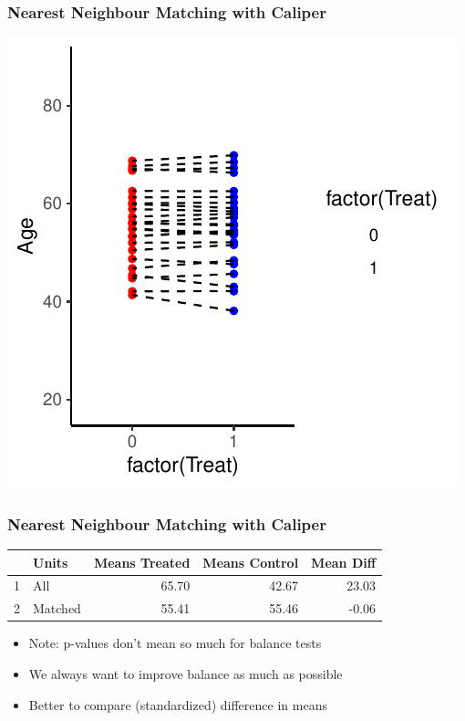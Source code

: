 \documentclass[xcolor=x11names,compress]{beamer}\usepackage[]{graphicx}\usepackage[]{color}
\makeatletter
\def\maxwidth{ %
  \ifdim\Gin@nat@width>\linewidth
    \linewidth
  \else
    \Gin@nat@width
  \fi
}
\newenvironment{knitrout}{}{} %
\renewcommand{\(}{\begin{columns}}
\renewcommand{\)}{\end{columns}}
\newcommand{\<}[1]{\begin{column}{#1}}
\renewcommand{\>}{\end{column}}
\makeatother
\begin{document}
\begin{frame}
\frametitle{Nearest Neighbour Matching with Caliper}
\begin{center}
\begin{knitrout}
\color{fgcolor}
\includegraphics[width=\maxwidth]{figure/nearest_matching_4_caliper-1} 

\end{knitrout}
\end{center}
\end{frame}

\begin{frame}
\frametitle{Nearest Neighbour Matching with Caliper}
\begin{center}
\begin{table}[ht]
\centering
\begin{tabular}{rlrrr}
  \hline
 & Units & Means Treated & Means Control & Mean Diff \\ 
  \hline
1 & All & 65.70 & 42.67 & 23.03 \\ 
  2 & Matched & 55.41 & 55.46 & -0.06 \\ 
   \hline
\end{tabular}
\end{table}

\end{center}
\begin{itemize}
\item Note: p-values don't mean so much for balance tests
\pause
\item We always want to improve balance as much as possible
\pause
\item Better to compare (standardized) difference in means
\end{itemize}
\end{frame}
\end{document}
